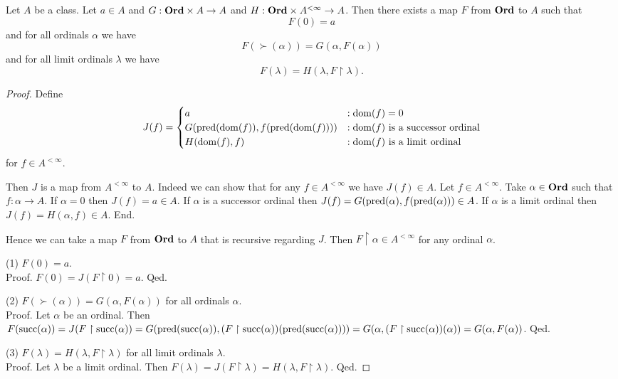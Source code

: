 \documentclass[../../set-theory/set-theory.tex]{subfiles}
\begin{document}
  \begin{forthel}
    \begin{theorem}
      Let $A$ be a class.
      Let $a \in A$ and $G : \mathbf{Ord} \times A \to A$ and
      $H : \mathbf{Ord} \times A^{< \infty} \to A$.
      Then there exists a map $F$ from $\mathbf{Ord}$ to $A$ such that
      \[ F(0) = a \]
      and for all ordinals $\alpha$ we have
      \[ F(\succ(\alpha)) = G(\alpha, F(\alpha)) \]
      and for all limit ordinals $\lambda$ we have
      \[ F(\lambda) = H(\lambda, F \restriction \lambda). \]
    \end{theorem}
    \begin{proof}
      Define  \[ J(f) =
        \begin{cases}
          a
          & : \operatorname{dom}(f) = 0
          \\
          G(\operatorname{pred}(\operatorname{dom}(f)), f(\operatorname{pred}(\operatorname{dom}(f))))
          & : \text{$\operatorname{dom}(f)$ is a successor ordinal}
          \\
          H(\operatorname{dom}(f), f)
          & : \text{$\operatorname{dom}(f)$ is a limit ordinal}
        \end{cases} \]
      for $f \in A^{< \infty}$.

      Then $J$ is a map from $A^{< \infty}$ to $A$.
      Indeed we can show that for any $f \in A^{< \infty}$ we have $J(f) \in A$.
        Let $f \in A^{< \infty}$.
        Take $\alpha \in \mathbf{Ord}$ such that $f : \alpha \to A$.
        If $\alpha = 0$ then $J(f) = a \in A$.
        If $\alpha$ is a successor ordinal then $J(f) =
        G(\operatorname{pred}(\alpha), f(\operatorname{pred}(\alpha))) \in A$.
        If $\alpha$ is a limit ordinal then $J(f) = H(\alpha, f) \in A$.
      End.

      Hence we can take a map $F$ from $\mathbf{Ord}$ to $A$ that is recursive regarding
      $J$.
      Then $F \restriction \alpha \in A^{< \infty}$ for any ordinal $\alpha$.

      (1) $F(0) = a$. \\
      Proof.
        $F(0)
          = J(F \restriction 0)
          = a$.
      Qed.

      (2) $F(\succ(\alpha)) = G(\alpha, F(\alpha))$ for all ordinals
      $\alpha$. \\
      Proof.
        Let $\alpha$ be an ordinal.
        Then $F(\operatorname{succ}(\alpha))
          = J(F \restriction \operatorname{succ}(\alpha))
          = G(\operatorname{pred}(\operatorname{succ}(\alpha)), (F \restriction \operatorname{succ}(\alpha))(\operatorname{pred}(\operatorname{succ}(\alpha))))
          = G(\alpha, (F \restriction \operatorname{succ}(\alpha))(\alpha))
          = G(\alpha, F(\alpha))$.
      Qed.

      (3) $F(\lambda) = H(\lambda, F \restriction \lambda)$ for all limit
      ordinals $\lambda$. \\
      Proof.
        Let $\lambda$ be a limit ordinal.
        Then $F(\lambda)
          = J(F \restriction \lambda)
          = H(\lambda, F \restriction \lambda)$.
      Qed.
    \end{proof}
  \end{forthel}
\end{document}
